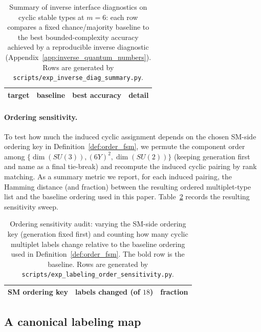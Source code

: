 \begin{table}[t]
\centering
\small
\setlength{\tabcolsep}{10pt}
\renewcommand{\arraystretch}{1.15}
\begin{tabular}{lccc}
\toprule
target & baseline & best accuracy & detail \\
\midrule
%
\end{tabular}
\caption{Summary of inverse interface diagnostics on cyclic stable types at $m=6$: each row compares a fixed chance/majority baseline to the best bounded-complexity accuracy achieved by a reproducible inverse diagnostic (Appendix~\ref{app:inverse_quantum_numbers}). Rows are generated by \texttt{scripts/exp\_inverse\_diag\_summary.py}.}
\label{tab:inverse_diag_summary}
\end{table}

\paragraph{Ordering sensitivity.}
To test how much the induced cyclic assignment depends on the chosen SM-side ordering key in Definition~\ref{def:order_fsm}, we permute the component order among $\{\dim(SU(3)),(6Y)^2,\dim(SU(2))\}$ (keeping generation first and name as a final tie-break) and recompute the induced cyclic pairing by rank matching.
As a summary metric we report, for each induced pairing, the Hamming distance (and fraction) between the resulting ordered multiplet-type list and the baseline ordering used in this paper.
Table~\ref{tab:labeling_order_sensitivity} records the resulting sensitivity sweep.

\begin{table}[t]
\centering
\small
\setlength{\tabcolsep}{8pt}
\renewcommand{\arraystretch}{1.15}
\begin{tabular}{lrr}
\toprule
SM ordering key & labels changed (of $18$) & fraction \\
\midrule
%
\end{tabular}
\caption{Ordering sensitivity audit: varying the SM-side ordering key (generation fixed first) and counting how many cyclic multiplet labels change relative to the baseline ordering used in Definition~\ref{def:order_fsm}. The bold row is the baseline. Rows are generated by \texttt{scripts/exp\_labeling\_order\_sensitivity.py}.}
\label{tab:labeling_order_sensitivity}
\end{table}

\subsection{A canonical labeling map}
\label{subsec:sm_labeling_map}

